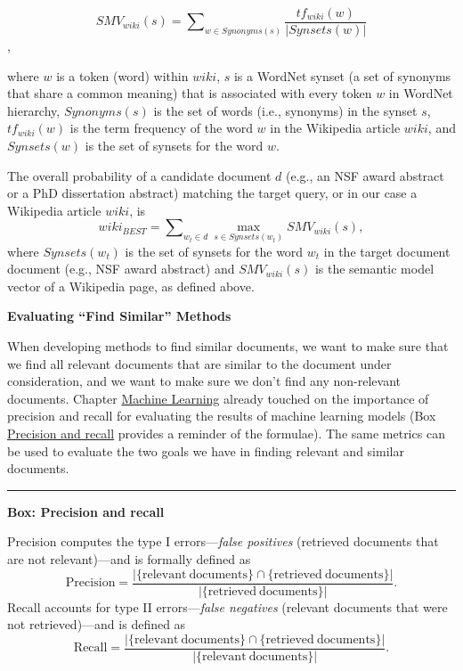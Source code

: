 \documentclass[]{krantz}
\begin{document}
\[SMV_{wiki}(s) = \sum\nolimits_{w\in Synonyms(s)} \frac{tf_{wiki}(w)}{|Synsets(w)|}\],

where \(w\) is a token (word) within \(wiki\), \(s\) is a WordNet synset
(a set of synonyms that share a common meaning) that is associated with
every token \(w\) in WordNet hierarchy, \(Synonyms(s)\) is the set of
words (i.e., synonyms) in the synset \(s\), \(tf_{wiki}(w)\) is the term
frequency of the word \(w\) in the Wikipedia article \(wiki\), and
\(Synsets(w)\) is the set of synsets for the word \(w\).

The overall probability of a candidate document \(d\) (e.g., an NSF
award abstract or a PhD dissertation abstract) matching the target
query, or in our case a Wikipedia article \(wiki\), is
\[wiki_{BEST}=\sum\nolimits_{w_t\in d} \max_{s\in Synsets(w_t)} SMV_{wiki}(s),\]
where \(Synsets(w_t)\) is the set of synsets for the word \(w_t\) in the
target document document (e.g., NSF award abstract) and
\(SMV_{wiki}(s)\) is the semantic model vector of a Wikipedia page, as
defined above.

\textbf{Evaluating ``Find Similar'' Methods}

When developing methods to find similar documents, we want to make sure
that we find all relevant documents that are similar to the document
under consideration, and we want to make sure we don't find any
non-relevant documents. Chapter \protect\hyperlink{chap:ml}{Machine
Learning} already touched on the importance of precision and recall for
evaluating the results of machine learning models (Box
\protect\hyperlink{box:text2}{Precision and recall} provides a reminder
of the formulae). The same metrics can be used to evaluate the two goals
we have in finding relevant and similar documents.

\begin{center}\rule{0.5\linewidth}{\linethickness}\end{center}

\textbf{Box: Precision and recall}

Precision computes the type I errors---\emph{false positives} (retrieved
documents that are not relevant)---and is formally defined as
\[\mathrm{Precision} = \frac{|\{\mathrm{relevant\ documents}\}\cap \{\mathrm{retrieved\ documents}\}|}{|\{\mathrm{retrieved\ documents}\}|}.\]
Recall accounts for type II errors---\emph{false negatives} (relevant
documents that were not retrieved)---and is defined as
\[\mathrm{Recall}=\frac{|\{\mathrm{relevant\ documents}\}\cap \{\mathrm{retrieved\ documents}\}|}{|\{\mathrm{relevant\ documents}\}|}.\]
\end{document}
